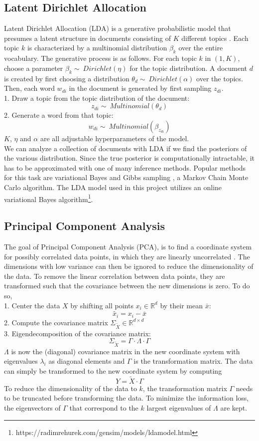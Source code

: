 \documentclass[conference]{IEEEtran}
\begin{document}
\subsection{Latent Dirichlet Allocation} \label{sec:lda}
Latent Dirichlet Allocation (LDA) is a generative probabilistic model that presumes a latent structure in documents consisting of $K$ different topics \cite{hoffman}. Each topic $k$ is characterized by a multinomial distribution $\beta_k$ over the entire vocabulary. The generative process is as follows. For each topic $k$ in $(1,K)$, choose a parameter ${\beta_k \sim\ Dirichlet(\eta)}$ for the topic distribution. A document $d$ is created by first choosing a distribution ${\theta_d \sim\ Dirichlet(\alpha)}$ over the topics. Then, each word $w_{di}$ in the document is generated by first sampling $z_{di}$.\\
1. Draw a topic from the topic distribution of the document:
$${z_{di} \sim\ Multinomial(\theta_d)}$$
2. Generate a word from that topic:
$${w_{di} \sim\ Multinomial(\beta_{z_{di}})}$$
$K$, $\eta$ and $\alpha$ are all adjustable hyperparameters of the model.\\
We can analyze a collection of documents with LDA if we find the posteriors of the various distribution. Since the true posterior is computationally intractable, it has to be approximated with one of many inference methods. Popular methods for this task are variational Bayes \cite{blei} and Gibbs sampling \cite{griffiths}, a Markov Chain Monte Carlo algorithm. The LDA model used in this project utilizes an online variational Bayes algorithm\footnote{https://radimrehurek.com/gensim/models/ldamodel.html}.

\subsection{Principal Component Analysis}
The goal of Principal Component Analysis (PCA), is to find a coordinate system for possibly correlated data points, in which they are linearly uncorrelated \cite{pca_leskovec, pca_jolliffe}. The dimensions with low variance can then be ignored to reduce the dimensionality of the data. To remove the linear correlation between data points, they are transformed such that the covariance between the new dimensions is zero. To do so,\\
1. Center the data $X$ by shifting all points $x_i \in \mathbb{R}^d$ by their mean $\bar{x}$: $${\widetilde{x_i} = x_i - \bar{x}}$$
2. Compute the covariance matrix $\Sigma_{\widetilde{X}} \in \mathbb{R}^{d{\times}d}$\\
3. Eigendecomposition of the covariance matrix: $$\Sigma_{\widetilde{X}} = \Gamma \cdot \Lambda \cdot \Gamma$$
$\Lambda$ is now the (diagonal) covariance matrix in the new coordinate system with eigenvalues $\lambda_i$ as diagonal elements and $\Gamma$ is the transformation matrix. The data can simply be transformed to the new coordinate system by computing $${Y = \widetilde{X} \cdot \Gamma}$$
To reduce the dimensionality of the data to $k$, the transformation matrix $\Gamma$ needs to be truncated before transforming the data. To minimize the information loss, the eigenvectors of $\Gamma$ that correspond to the $k$ largest eigenvalues of $\Lambda$ are kept.
\end{document}
